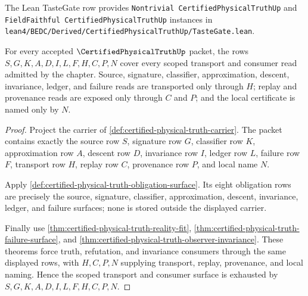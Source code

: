

The Lean TasteGate row provides \texttt{Nontrivial CertifiedPhysicalTruthUp} and \texttt{FieldFaithful CertifiedPhysicalTruthUp} instances in \texttt{lean4/BEDC/Derived/CertifiedPhysicalTruthUp/TasteGate.lean}.

\begin{theorem}
\label{thm:certified-physical-truth-scoped-transport-coverage}
For every accepted $\CertifiedPhysicalTruthUp$ packet, the rows $S,G,K,A,D,I,L,F,H,C,P,N$ cover every scoped transport and consumer read admitted by the chapter. Source, signature, classifier, approximation, descent, invariance, ledger, and failure reads are transported only through $H$; replay and provenance reads are exposed only through $C$ and $P$; and the local certificate is named only by $N$.
\end{theorem}
\begin{proof}
Project the carrier of \autoref{def:certified-physical-truth-carrier}. The packet contains exactly the source row $S$, signature row $G$, classifier row $K$, approximation row $A$, descent row $D$, invariance row $I$, ledger row $L$, failure row $F$, transport row $H$, replay row $C$, provenance row $P$, and local name $N$.

Apply \autoref{def:certified-physical-truth-obligation-surface}. Its eight obligation rows are precisely the source, signature, classifier, approximation, descent, invariance, ledger, and failure surfaces; none is stored outside the displayed carrier.

Finally use \autoref{thm:certified-physical-truth-reality-fit}, \autoref{thm:certified-physical-truth-failure-surface}, and \autoref{thm:certified-physical-truth-observer-invariance}. These theorems force truth, refutation, and invariance consumers through the same displayed rows, with $H,C,P,N$ supplying transport, replay, provenance, and local naming. Hence the scoped transport and consumer surface is exhausted by $S,G,K,A,D,I,L,F,H,C,P,N$.
\end{proof}

